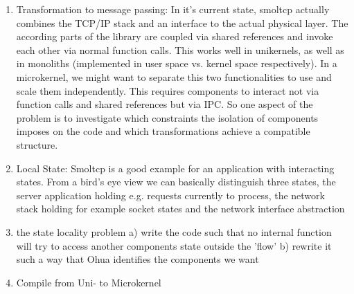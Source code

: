     \begin{enumerate}
        \item Transformation to message passing: In it's current state, smoltcp actually combines the TCP/IP stack and an interface to the actual physical layer. The according parts of the library are coupled via shared references and invoke each other via normal function calls. This works well in unikernels, as well as in monoliths (implemented in user space vs. kernel space respectively). In a microkernel, we might want to separate this two functionalities to use and scale them independently. This requires components to interact not via function calls and shared references but via IPC. So one aspect of the problem is to investigate which constraints the isolation of components imposes on the code and which transformations achieve a compatible structure. 
        \item Local State: Smoltcp is a good example for an application with interacting states. From a bird's eye view we can basically distinguish three states, the server application holding e.g. requests currently to process, the network stack holding for example socket states and the network interface abstraction
    
        \item the state locality problem a) write the code such that no internal function will try to access another components state outside the 'flow' b) rewrite it such a way that Ohua identifies the components we want
        
        \item Compile from Uni- to Microkernel 
    \end{enumerate}

